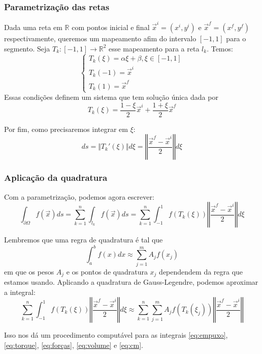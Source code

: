 \documentclass[
	12pt,				%
	oneside,			%
	a4paper,			%
	]{article}
\begin{document}
    \subsubsection{Parametrização das retas}
    Dada uma reta em $\mathbb{R}$ com pontos inicial e final $\vec{x}^i = (x^i, y^i)$ e $\vec{x}^f = (x^f, y^f)$ respectivamente, queremos um mapeamento afim do intervalo $[-1,1]$ para o segmento. Seja $T_{k}:[-1,1] \to \mathbb{R}^2$ esse mapeamento para a reta $l_k$. Temos:
    \[
        \begin{cases}
            T_k(\xi) = \alpha \xi + \beta, \xi \in [-1,1] \\
            T_k(-1) = \vec{x}^i \\
            T_k(1) = \vec{x}^f
        \end{cases}
    \] 
    Essas condições definem um sistema que tem solução única dada por
    \[
        T_k(\xi) = \frac{1-\xi}{2}\vec{x}^i + \frac{1 + \xi}{2} \vec{x}^f
    \]

    Por fim, como precisaremos integrar em $\xi$:
    \[
        ds = \Vert T_k'(\xi)\Vert d \xi = \left\Vert \frac{\vec{x}^f - \vec{x}^i}{2} \right\Vert d \xi
    \]

    \subsubsection{Aplicação da quadratura}
    Com a parametrização, podemos agora escrever:
    \begin{equation}
        \int_{\partial \Omega} f(\vec{x}) ds = \sum_{k=1}^{n} \int_{l_k} f(\vec{x}) ds = \sum_{k=1}^{n} \int^1_{-1} f(T_k(\xi)) \left\Vert \frac{\vec{x}^f - \vec{x}^i}{2} \right\Vert d \xi
        \label{eq:param}
    \end{equation}

    Lembremos que uma regra de quadratura é tal que 
    \[
        \int_{a}^{b} f(x) dx \approx \sum_{j=1}^{m} A_j f(x_j)
    \]
    em que os pesos $A_j$ e os pontos de quadratura $x_j$ dependendem da regra que estamos usando. Aplicando a quadratura de Gauss-Legendre, podemos aproximar a integral:
    \begin{equation}
        \sum_{k=1}^{n} \int^1_{-1} f(T_k(\xi)) \left\Vert \frac{\vec{x}^f - \vec{x}^i}{2} \right\Vert d \xi \approx \sum_{k=1}^{n} \sum_{j=1}^{m} A_j f(T_k(\xi_j)) \left\Vert \frac{\vec{x}^f - \vec{x}^i}{2} \right\Vert
        \label{eq:quad}
    \end{equation}

    Isso nos dá um procedimento computável para as integrais \ref{eq:empuxo}, \ref{eq:torque}, \ref{eq:forças}, \ref{eq:volume} e \ref{eq:cm}.
\end{document}
